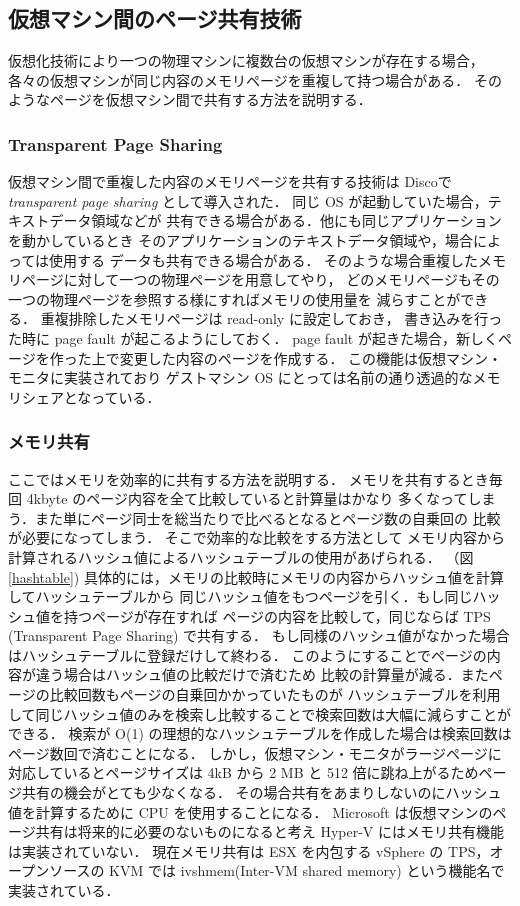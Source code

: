 \documentclass[graduation-thesis]{mlarticle}
\begin{document}
\subsection{仮想マシン間のページ共有技術}
\label{sec-2-4}
仮想化技術により一つの物理マシンに複数台の仮想マシンが存在する場合，
各々の仮想マシンが同じ内容のメモリページを重複して持つ場合がある．
そのようなページを仮想マシン間で共有する方法を説明する．
\subsubsection{Transparent Page Sharing}
\label{sec-2-4-1}
仮想マシン間で重複した内容のメモリページを共有する技術は
Disco\cite{disco}で 
{\it transparent page sharing}
として導入された．
同じ OS が起動していた場合，テキストデータ領域などが
共有できる場合がある．他にも同じアプリケーションを動かしているとき
そのアプリケーションのテキストデータ領域や，場合によっては使用する
データも共有できる場合がある．
そのような場合重複したメモリページに対して一つの物理ページを用意してやり，
どのメモリページもその一つの物理ページを参照する様にすればメモリの使用量を
減らすことができる．
重複排除したメモリページは read-only に設定しておき，
書き込みを行った時に page fault が起こるようにしておく．
page fault が起きた場合，新しくページを作った上で変更した内容のページを作成する．
この機能は仮想マシン・モニタに実装されており
ゲストマシン OS にとっては名前の通り透過的なメモリシェアとなっている．

\subsubsection{メモリ共有}
\label{sec-2-4-2}
ここではメモリを効率的に共有する方法\cite{sharing}を説明する．
メモリを共有するとき毎回 4kbyte のページ内容を全て比較していると計算量はかなり
多くなってしまう．また単にページ同士を総当たりで比べるとなるとページ数の自乗回の
比較が必要になってしまう．
そこで効率的な比較をする方法として
メモリ内容から計算されるハッシュ値によるハッシュテーブルの使用があげられる．
（図\ref{hashtable})
具体的には，メモリの比較時にメモリの内容からハッシュ値を計算してハッシュテーブルから
同じハッシュ値をもつページを引く．もし同じハッシュ値を持つページが存在すれば
ページの内容を比較して，同じならば TPS (Transparent Page Sharing) で共有する．
もし同様のハッシュ値がなかった場合はハッシュテーブルに登録だけして終わる．
このようにすることでページの内容が違う場合はハッシュ値の比較だけで済むため
比較の計算量が減る．またページの比較回数もページの自乗回かかっていたものが
ハッシュテーブルを利用して同じハッシュ値のみを検索し比較することで検索回数は大幅に減らすことができる．
検索が O(1) の理想的なハッシュテーブルを作成した場合は検索回数はページ数回で済むことになる．
しかし，仮想マシン・モニタがラージページに対応しているとページサイズは 4kB から
2 MB と 512 倍に跳ね上がるためページ共有の機会がとても少なくなる．
その場合共有をあまりしないのにハッシュ値を計算するために CPU を使用することになる．
Microsoft は仮想マシンのページ共有は将来的に必要のないものになると考え
Hyper-V にはメモリ共有機能は実装されていない．
現在メモリ共有は ESX を内包する vSphere の TPS，オープンソースの KVM では
ivshmem(Inter-VM shared memory) という機能名で実装されている．
\end{document}
